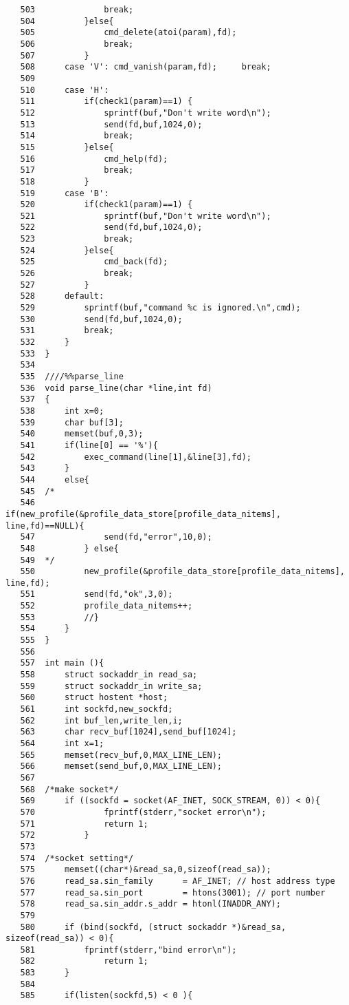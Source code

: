 \documentclass{jarticle}[11pt]
\begin{document}
\begin{itemize}
\begin{verbatim}
   503	            break;
   504	        }else{
   505	            cmd_delete(atoi(param),fd);
   506	            break;
   507	        }
   508	    case 'V': cmd_vanish(param,fd);     break;
   509	        
   510	    case 'H': 
   511	        if(check1(param)==1) {
   512	            sprintf(buf,"Don't write word\n");
   513	            send(fd,buf,1024,0);
   514	            break;
   515	        }else{ 
   516	            cmd_help(fd); 
   517	            break;
   518	        }
   519	    case 'B':
   520	        if(check1(param)==1) {
   521	            sprintf(buf,"Don't write word\n");
   522	            send(fd,buf,1024,0);
   523	            break;
   524	        }else{ 
   525	            cmd_back(fd); 
   526	            break;
   527	        }
   528	    default:
   529	        sprintf(buf,"command %c is ignored.\n",cmd);
   530	        send(fd,buf,1024,0);
   531	        break;
   532	    }
   533	}
   534	
   535	////%%parse_line
   536	void parse_line(char *line,int fd)
   537	{
   538	    int x=0;
   539	    char buf[3];
   540	    memset(buf,0,3);
   541	    if(line[0] == '%'){
   542	        exec_command(line[1],&line[3],fd);
   543	    }
   544	    else{
   545	/*
   546	        if(new_profile(&profile_data_store[profile_data_nitems], line,fd)==NULL){
   547	            send(fd,"error",10,0);
   548	        } else{
   549	*/
   550	        new_profile(&profile_data_store[profile_data_nitems], line,fd);
   551	        send(fd,"ok",3,0);
   552	        profile_data_nitems++;
   553	        //}
   554	    }
   555	}
   556	
   557	int main (){
   558	    struct sockaddr_in read_sa;
   559	    struct sockaddr_in write_sa;
   560	    struct hostent *host;
   561	    int sockfd,new_sockfd;
   562	    int buf_len,write_len,i;
   563	    char recv_buf[1024],send_buf[1024];
   564	    int x=1;
   565	    memset(recv_buf,0,MAX_LINE_LEN);
   566	    memset(send_buf,0,MAX_LINE_LEN);
   567	
   568	/*make socket*/
   569	    if ((sockfd = socket(AF_INET, SOCK_STREAM, 0)) < 0){
   570	            fprintf(stderr,"socket error\n");
   571	            return 1;
   572	        }
   573	
   574	/*socket setting*/
   575	    memset((char*)&read_sa,0,sizeof(read_sa));
   576	    read_sa.sin_family      = AF_INET; // host address type
   577	    read_sa.sin_port        = htons(3001); // port number
   578	    read_sa.sin_addr.s_addr = htonl(INADDR_ANY);
   579	
   580	    if (bind(sockfd, (struct sockaddr *)&read_sa, sizeof(read_sa)) < 0){
   581	        fprintf(stderr,"bind error\n");
   582	            return 1;
   583	    }
   584	    
   585	    if(listen(sockfd,5) < 0 ){

\end{verbatim}
\end{itemize}
\end{document}
